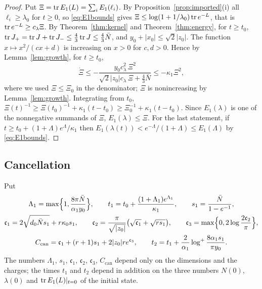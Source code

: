 \begin{proof}
Put $\Xi=\operatorname{tr} E_1(L)=\sum_iE_1(\ell_i)$. By
Proposition~\ref{prop:imported}(i) all $\ell_i\geq\lambda_0$ for $t\geq0$, so
\eqref{eq:E1bounds} gives $\Xi\leq\log(1+1/\lambda_0)\operatorname{tr} e^{-L}$, that is
$\operatorname{tr} e^{-L}\geq c_\lambda\Xi$. By Theorem~\ref{thm:kernel} and
Theorem~\ref{thm:energy}, for $t\geq t_0$,
$\operatorname{tr} J_+=\operatorname{tr} J+\operatorname{tr} J_-\leq\frac43\operatorname{tr} J\leq\frac43\bar N$, and
$y_0+|x_0|\leq\sqrt2|z_0|$. The function $x\mapsto x^2/(cx+d)$ is increasing
on $x>0$ for $c,d>0$. Hence by Lemma~\ref{lem:growth}, for $t\geq t_0$,
\[
 \dot\Xi\leq-\frac{y_0c_\lambda^2\,\Xi^2}{\sqrt2|z_0|c_\lambda\,\Xi+\frac43\bar N}
 \leq-\kappa_1\Xi^2,
\]
where we used $\Xi\leq\Xi_0$ in the denominator; $\Xi$ is nonincreasing by
Lemma~\ref{lem:growth}. Integrating from $t_0$,
$\Xi(t)^{-1}\geq\Xi(t_0)^{-1}+\kappa_1(t-t_0)\geq\Xi_0^{-1}+\kappa_1(t-t_0)$.
Since $E_1(\lambda)$ is one of the nonnegative summands of $\Xi$,
$E_1(\lambda)\leq\Xi$. For the last statement, if
$t\geq t_0+(1+\Lambda)e^\Lambda/\kappa_1$ then
$E_1(\lambda(t))<e^{-\Lambda}/(1+\Lambda)\leq E_1(\Lambda)$ by
\eqref{eq:E1bounds}.
\end{proof}

\subsection{Cancellation}
Put
\begin{equation}\label{eq:constants}
 \begin{gathered}
 \Lambda_1=\max\Bigl\{1,\frac{8\pi\bar N}{\alpha_1y_0}\Bigr\},\qquad
 t_1=t_0+\frac{(1+\Lambda_1)e^{\Lambda_1}}{\kappa_1},\qquad
 s_1=\frac{\bar N}{1-e^{-1}},\\
 \mathfrak c_1=2\sqrt{d_0\bar Ns_1}+r\kappa_0s_1,\qquad
 \mathfrak c_2=\frac\pi{\sqrt{|z_0|}}\bigl(\sqrt{\mathfrak c_1}+\sqrt{rs_1}\bigr),\qquad
 \mathfrak c_3=\max\Bigl\{0,2\log\frac{2\mathfrak c_2}\pi\Bigr\},\\
 C_{\mathrm{can}}=\mathfrak c_1+(r+1)s_1+2|z_0|re^{\mathfrak c_3},\qquad
 t_2=t_1+\frac2{\alpha_1}\log^+\frac{8\alpha_1s_1}{\pi y_0}.
 \end{gathered}
\end{equation}
The numbers $\Lambda_1$, $s_1$, $\mathfrak c_1$, $\mathfrak c_2$,
$\mathfrak c_3$, $C_{\mathrm{can}}$ depend only on the dimensions and the charges; the times $t_1$ and $t_2$
depend in addition on the three numbers $N(0)$, $\lambda(0)$ and
$\operatorname{tr} E_1(L)|_{t=0}$ of the initial state.

